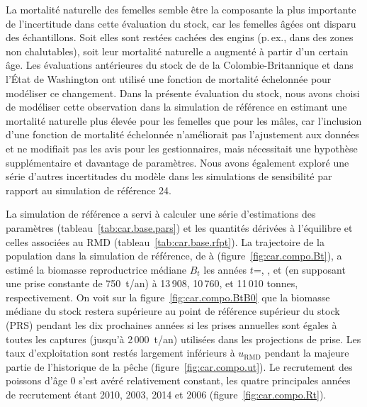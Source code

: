 \documentclass[11pt]{book}
\newcommand{\umsy}{u_\text{RMD}}
\begin{document}
La mortalit\'{e} naturelle des femelles semble \^{e}tre la composante la plus importante de l'incertitude dans cette \'{e}valuation du stock, car les femelles \^{a}g\'{e}es ont disparu des \'{e}chantillons. Soit elles sont rest\'{e}es cach\'{e}es des engins (p.\,ex., dans des zones non chalutables), soit leur mortalit\'{e} naturelle a augment\'{e} \`{a} partir d'un certain \^{a}ge.
Les \'{e}valuations ant\'{e}rieures du stock de \SPC{} de la Colombie-Britannique et dans l'\'{E}tat de Washington ont utilis\'{e} une fonction de mortalit\'{e} \'{e}chelonn\'{e}e pour mod\'{e}liser ce changement. 
Dans la pr\'{e}sente \'{e}valuation du stock, nous avons choisi de mod\'{e}liser cette observation dans la simulation de r\'{e}f\'{e}rence en estimant une mortalit\'{e} naturelle plus \'{e}lev\'{e}e pour les femelles que pour les m\^{a}les, car l'inclusion d'une fonction de mortalit\'{e} \'{e}chelonn\'{e}e n'am\'{e}liorait pas l'ajustement aux donn\'{e}es et ne modifiait pas les avis pour les gestionnaires, mais n\'{e}cessitait une hypoth\`{e}se suppl\'{e}mentaire et davantage de param\`{e}tres. Nous avons \'{e}galement explor\'{e} une s\'{e}rie d'autres incertitudes du mod\`{e}le dans les simulations de sensibilit\'{e} par rapport au simulation de r\'{e}f\'{e}rence 24.

La simulation de r\'{e}f\'{e}rence a servi \`{a} calculer une s\'{e}rie d'estimations des param\`{e}tres (tableau~\ref{tab:car.base.pars}) et les quantit\'{e}s d\'{e}riv\'{e}es \`{a} l'\'{e}quilibre et celles associ\'{e}es au RMD (tableau~\ref{tab:car.base.rfpt}).
La trajectoire de la population dans la simulation de r\'{e}f\'{e}rence, de \startYear{} \`{a} \currYear{} (figure~\ref{fig:car.compo.Bt}), a estim\'{e} la biomasse reproductrice m\'{e}diane $B_t$ les ann\'{e}es $t$=\startYear, \currYear, et \projYear{} (en supposant une prise constante de 750~t/an) \`{a} 13\,908, 10\,760, et 11\,010 tonnes, respectivement.
On voit sur la figure~\ref{fig:car.compo.BtB0} que la biomasse m\'{e}diane du stock restera sup\'{e}rieure au point de r\'{e}f\'{e}rence sup\'{e}rieur du stock (PRS) pendant les dix prochaines ann\'{e}es si les prises annuelles sont \'{e}gales \`{a} toutes les captures (jusqu'\`{a} 2\,000~t/an) utilis\'{e}es dans les projections de prise.
Les taux d'exploitation sont rest\'{e}s largement inf\'{e}rieurs \`{a} $\umsy$ pendant la majeure partie de l'historique de la p\^{e}che (figure~\ref{fig:car.compo.ut}).
Le recrutement des poissons d'\^{a}ge 0 s'est av\'{e}r\'{e} relativement constant, les quatre principales ann\'{e}es de recrutement \'{e}tant 2010, 2003, 2014 et 2006 (figure~\ref{fig:car.compo.Rt}).
\end{document}
